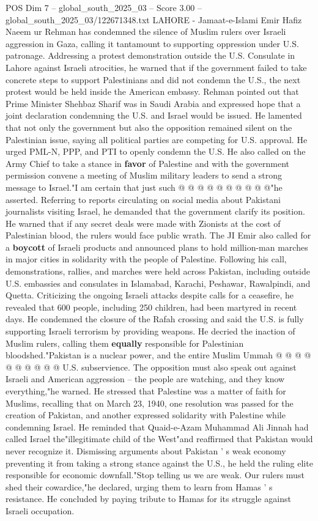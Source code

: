\begin{textsample}{POS Dim 7 – global\_south\_2025\_03 – Score 3.00 – global\_south\_2025\_03/122671348.txt}  \label{ex:f7_pos_431}
LAHORE - Jamaat-e-Islami Emir Hafiz Naeem ur Rehman has condemned the silence of Muslim rulers over Israeli aggression in Gaza, calling it tantamount to supporting oppression under U.S. patronage.
Addressing a protest demonstration outside the U.S.
Consulate in Lahore against Israeli atrocities, he warned that if the government failed to take concrete steps to support Palestinians and did not condemn the U.S., the next protest would be held inside the American embassy.
Rehman pointed out that Prime Minister Shehbaz Sharif was in Saudi Arabia and expressed hope that a joint declaration condemning the U.S. and Israel would be issued.
He lamented that not only the government but also the opposition remained silent on the Palestinian issue, saying all political parties are competing for U.S. approval.
He urged PML-N, PPP, and PTI to openly condemn the U.S.
He also called on the Army Chief to take a stance in \textbf{favor} of Palestine and with the government permission convene a meeting of Muslim military leaders to send a strong message to Israel."I am certain that just such @ @ @ @ @ @ @ @ @ @"he asserted.
Referring to reports circulating on social media about Pakistani journalists visiting Israel, he demanded that the government clarify its position.
He warned that if any secret deals were made with Zionists at the cost of Palestinian blood, the rulers would face public wrath.
The JI Emir also called for a \textbf{boycott} of Israeli products and announced plans to hold million-man marches in major cities in solidarity with the people of Palestine.
Following his call, demonstrations, rallies, and marches were held across Pakistan, including outside U.S. embassies and consulates in Islamabad, Karachi, Peshawar, Rawalpindi, and Quetta.
Criticizing the ongoing Israeli attacks despite calls for a ceasefire, he revealed that 600 people, including 250 children, had been martyred in recent days.
He condemned the closure of the Rafah crossing and said the U.S. is fully supporting Israeli terrorism by providing weapons.
He decried the inaction of Muslim rulers, calling them \textbf{equally} responsible for Palestinian bloodshed."Pakistan is a nuclear power, and the entire Muslim Ummah @ @ @ @ @ @ @ @ @ @ U.S. subservience.
The opposition must also speak out against Israeli and American aggression -- the people are watching, and they know everything,"he warned.
He stressed that Palestine was a matter of faith for Muslims, recalling that on March 23, 1940, one resolution was passed for the creation of Pakistan, and another expressed solidarity with Palestine while condemning Israel.
He reminded that Quaid-e-Azam Muhammad Ali Jinnah had called Israel the"illegitimate child of the West"and reaffirmed that Pakistan would never recognize it.
Dismissing arguments about Pakistan ' s weak economy preventing it from taking a strong stance against the U.S., he held the ruling elite responsible for economic downfall."Stop telling us we are weak.
Our rulers must shed their cowardice,"he declared, urging them to learn from Hamas ' s resistance.
He concluded by paying tribute to Hamas for its struggle against Israeli occupation.

\end{textsample}
